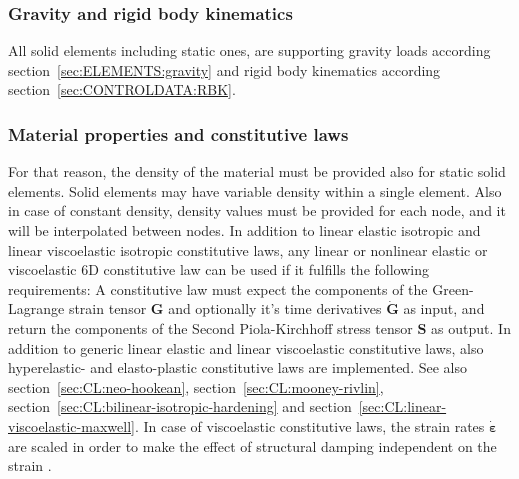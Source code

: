 \subsubsection{Gravity and rigid body kinematics}
All solid elements including static ones, are supporting gravity loads according section~\ref{sec:ELEMENTS:gravity}
and rigid body kinematics according section~\ref{sec:CONTROLDATA:RBK}.
\subsubsection{Material properties and constitutive laws}
For that reason, the density of the material must be provided also for static solid elements.
Solid elements may have variable density within a single element.
Also in case of constant density, density values must be provided for each node, and it will be interpolated between nodes.
In addition to linear elastic isotropic and linear viscoelastic isotropic constitutive laws,
any linear or nonlinear elastic or viscoelastic 6D constitutive law can be used if it fulfills the following requirements:
A constitutive law must expect the components of the Green-Lagrange strain tensor $\boldsymbol{G}$
and optionally it's time derivatives $\dot{\boldsymbol{G}}$ as input, and return the components of the Second Piola-Kirchhoff
stress tensor $\boldsymbol{S}$ as output. In addition to generic linear elastic and linear viscoelastic constitutive laws,
also hyperelastic- and elasto-plastic constitutive laws are implemented.
See also section~\ref{sec:CL:neo-hookean}, section~\ref{sec:CL:mooney-rivlin}, section~\ref{sec:CL:bilinear-isotropic-hardening} and section~\ref{sec:CL:linear-viscoelastic-maxwell}.
In case of viscoelastic constitutive laws, the strain rates $\dot{\boldsymbol{\varepsilon}}$ are scaled in order to make
the effect of structural damping independent on the strain \cite{KUEBLER2005}.

